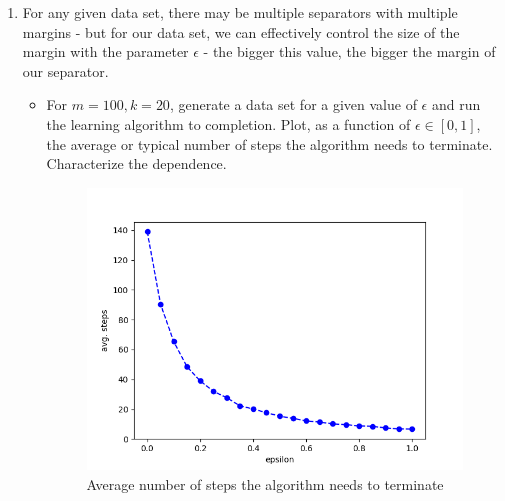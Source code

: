 \documentclass[letter, 12pt]{article}
\begin{document}
\begin{enumerate}
        \item {For any given data set, there may be multiple separators with multiple margins - but for our data set, we can effectively control the size of the margin with the parameter $ \epsilon $ - the bigger this value, the bigger the margin of our separator.}
        \begin{itemize}
            \item {For $ m = 100, k = 20 $, generate a data set for a given value of $ \epsilon $ and run the learning algorithm to
                completion. Plot, as a function of $ \epsilon \in [0, 1] $, the average or typical number of steps the algorithm needs to
                terminate. Characterize the dependence.}
            \begin{figure}[H]
            	\centering
            	\includegraphics[width=.7\textwidth]{q3.png}
            	\caption{Average number of steps the algorithm needs to terminate}
            \end{figure}
        \end{itemize}
    

\end{enumerate}
\end{document}
